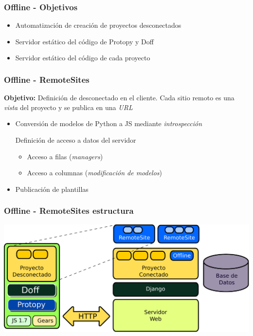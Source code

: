 \documentclass{beamer}
\begin{document}
\begin{farme}
    \frametitle{Offline - Objetivos}
    \begin{itemize}
        \item{Automatización de creación de proyectos desconectados}
        \item{Servidor estático del código de Protopy y Doff}
        \item{Servidor estático del código de cada proyecto}
    \end{itemize}
            
\end{farme}

\begin{frame}

    \frametitle{Offline - RemoteSites}
    \par{
        \par{\bf Objetivo:}
        Definición de desconectado en el cliente. Cada sitio remoto es una {\it vista}
        del proyecto y se publica en una {\it URL}

    }
    \begin{itemize}
      \item{Conversión de modelos de Python a JS mediante {\it introspección}}
      \begin{item}Definición de acceso a datos del servidor
        \begin{itemize}
          \item {Acceso a filas ({\it managers})}
          \item {Acceso a columnas ({\it modificación de modelos})}
        \end{itemize}
      \end{item}
      \item{Publicación de plantillas}
    \end{itemize}

\end{frame}

\begin{frame}

    \frametitle{Offline - RemoteSites estructura}
    \includegraphics[scale=0.5]{remote_sites.pdf}
    
\end{frame}
\end{document}

